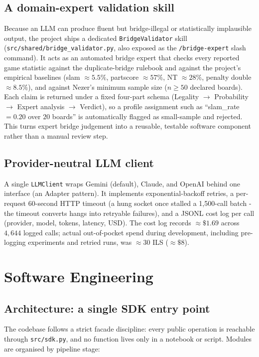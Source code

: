 \documentclass[11pt, a4paper, oneside, openany]{report}
\begin{document}
\section{A domain-expert validation skill}
Because an LLM can produce fluent but bridge-illegal or statistically
implausible output, the project ships a dedicated
\texttt{BridgeValidator} skill (\texttt{src/shared/bridge\_validator.py},
also exposed as the \texttt{/bridge-expert} slash command). It acts as an
automated bridge expert that checks every reported game statistic against
the duplicate-bridge rulebook and against the project's empirical baselines
(slam ${\approx}5.5\%$, partscore ${\approx}57\%$, NT ${\approx}28\%$,
penalty double ${\approx}8.5\%$), and against Nezer's minimum sample size
($n \geq 50$ declared boards). Each claim is returned under a fixed
four-part schema (Legality $\rightarrow$ Probability $\rightarrow$ Expert
analysis $\rightarrow$ Verdict), so a profile assignment such as
``slam\_rate $=0.20$ over $20$ boards'' is automatically flagged as
small-sample and rejected. This turns expert bridge judgement into a
reusable, testable software component rather than a manual review step.

\section{Provider-neutral LLM client}
A single \texttt{LLMClient} wraps Gemini (default), Claude, and OpenAI behind
one interface (an Adapter pattern). It implements exponential-backoff
retries, a per-request 60-second HTTP timeout (a hung socket once stalled a
1{,}500-call batch - the timeout converts hangs into retryable failures),
and a JSONL cost log per call (provider, model, tokens, latency, USD).
The cost log records ${\approx}\$1.69$ across $4{,}644$ logged calls; actual
out-of-pocket spend during development, including pre-logging experiments and
retried runs, was ${\approx}30$ ILS (${\approx}\$8$).

\chapter{Software Engineering}
\label{ch:se}

\section{Architecture: a single SDK entry point}
The codebase follows a strict facade discipline: every public operation is
reachable through \texttt{src/sdk.py}, and no function lives only in a
notebook or script. Modules are organised by pipeline stage:
\end{document}
